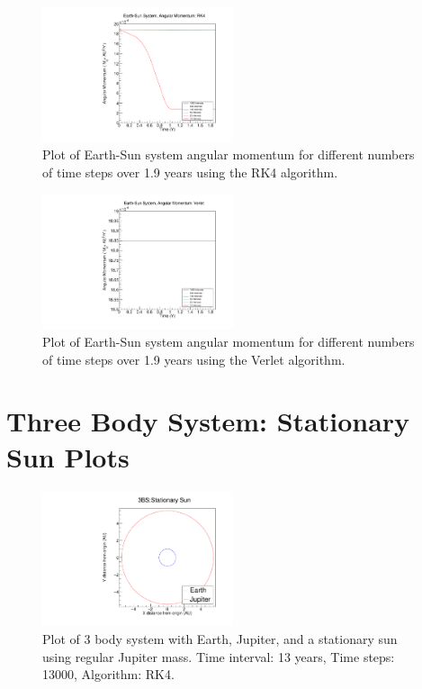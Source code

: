 \documentclass[a4paper,12pt]{report}
\begin{document}
\begin{figure}[H]
 \centering
   \includegraphics[width=0.5\textwidth]{ESRK4_l.pdf}
  \caption{Plot of Earth-Sun system angular momentum for different numbers of time steps over 1.9 years using the RK4 algorithm.}
  \label{fig:ESRK4_l}
 \end{figure}



\begin{figure}[H]
 \centering
   \includegraphics[width=0.5\textwidth]{ESVerlet_l.pdf}
  \caption{Plot of Earth-Sun system angular momentum for different numbers of time steps over 1.9 years using the Verlet algorithm.}
  \label{fig:ESVerlet_l}
 \end{figure}
 
 \chapter{Three Body System: Stationary Sun Plots}\label{app:3bsss}
 
 \begin{figure}[H]
 \centering
   \includegraphics[width=0.5\textwidth]{ESJFRK4_reg.pdf}
  \caption{Plot of 3 body system with Earth, Jupiter, and a stationary sun using regular Jupiter mass. Time interval: 13 years, Time steps: 13000, Algorithm: RK4.}
  \label{fig:ESJFRK4_reg}
 \end{figure}
 
\end{document}
